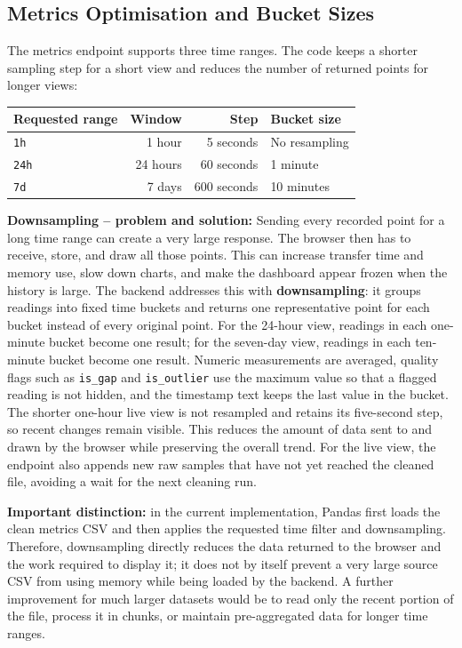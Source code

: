 \subsection{Metrics Optimisation and Bucket Sizes}
The metrics endpoint supports three time ranges. The code keeps a shorter sampling step for a short view and reduces the number of returned points for longer views:

\begin{center}
\small
\begin{tabularx}{0.78\linewidth}{@{}lrrl@{}}
\toprule
\textbf{Requested range} & \textbf{Window} & \textbf{Step} & \textbf{Bucket size}\\
\midrule
\texttt{1h} & 1 hour & 5 seconds & No resampling\\
\texttt{24h} & 24 hours & 60 seconds & 1 minute\\
\texttt{7d} & 7 days & 600 seconds & 10 minutes\\
\bottomrule
\end{tabularx}
\end{center}

\textbf{Downsampling -- problem and solution:} Sending every recorded point for a long time range can create a very large response. The browser then has to receive, store, and draw all those points. This can increase transfer time and memory use, slow down charts, and make the dashboard appear frozen when the history is large. The backend addresses this with \textbf{downsampling}: it groups readings into fixed time buckets and returns one representative point for each bucket instead of every original point. For the 24-hour view, readings in each one-minute bucket become one result; for the seven-day view, readings in each ten-minute bucket become one result. Numeric measurements are averaged, quality flags such as \texttt{is\_gap} and \texttt{is\_outlier} use the maximum value so that a flagged reading is not hidden, and the timestamp text keeps the last value in the bucket. The shorter one-hour live view is not resampled and retains its five-second step, so recent changes remain visible. This reduces the amount of data sent to and drawn by the browser while preserving the overall trend. For the live view, the endpoint also appends new raw samples that have not yet reached the cleaned file, avoiding a wait for the next cleaning run.

\textbf{Important distinction:} in the current implementation, Pandas first loads the clean metrics CSV and then applies the requested time filter and downsampling. Therefore, downsampling directly reduces the data returned to the browser and the work required to display it; it does not by itself prevent a very large source CSV from using memory while being loaded by the backend. A further improvement for much larger datasets would be to read only the recent portion of the file, process it in chunks, or maintain pre-aggregated data for longer time ranges.

